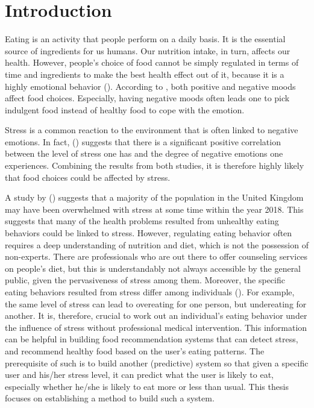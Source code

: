 
\chapter{Introduction}\label{chapter:introduction}
Eating is an activity that people perform on a daily basis. It is the essential source of ingredients for us humans. Our nutrition intake, in turn, affects our health. However, people’s choice of food cannot be simply regulated in terms of time and ingredients to make the best health effect out of it, because it is a highly emotional behavior (\cite{4_mood_eat}). According to \citeauthor{4_mood_eat}, both positive and negative moods affect food choices. Especially, having negative moods often leads one to pick indulgent food instead of healthy food to cope with the emotion.

Stress is a common reaction to the environment that is often linked to negative emotions. In fact, \citeauthor{1_stress_emotion} (\citeyear{1_stress_emotion}) suggests that there is a significant positive correlation between the level of stress one has and the degree of negative emotions one experiences. Combining the results from both studies, it is therefore highly likely that food choices could be affected by stress.

A study by \citeauthor{2_many_stress} (\citeyear{2_many_stress}) suggests that a majority of the population in the United Kingdom may have been overwhelmed with stress at some time within the year 2018. This suggests that many of the health problems resulted from unhealthy eating behaviors could be linked to stress. However, regulating eating behavior often requires a deep understanding of nutrition and diet, which is not the possession of non-experts. There are professionals who are out there to offer counseling services on people’s diet, but this is understandably not always accessible by the general public, given the pervasiveness of stress among them. Moreover, the specific eating behaviors resulted from stress differ among individuals (\cite{5_stress_eating}). For example, the same level of stress can lead to overeating for one person, but undereating for another. It is, therefore, crucial to work out an individual’s eating behavior under the influence of stress without professional medical intervention. This information can be helpful in building food recommendation systems that can detect stress, and recommend healthy food based on the user’s eating patterns. The prerequisite of such is to build another (predictive) system so that given a specific user and his/her stress level, it can predict what the user is likely to eat, especially whether he/she is likely to eat more or less than usual. This thesis focuses on establishing a method to build such a system. \bigskip

